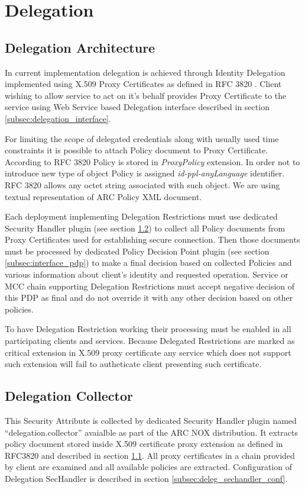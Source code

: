 \documentclass{article}                            %
\begin{document}



\section{Delegation} %
\label{sec:delegation}

\subsection{Delegation Architecture} %
\label{subsec:delegation_arch}
In current implementation delegation is achieved through Identity Delegation implemented using X.509 Proxy Certificates as defined in RFC 3820 \cite{x509proxy}. Client wishing to allow service to act on it's behalf provides Proxy Certificate to the service using Web Service based Delegation interface described in section \ref{subsec:delegation_interface}.

For limiting the scope of delegated credentials along with usually used time constraints it is possible to attach Policy document to Proxy Certificate. According to RFC 3820 Policy is stored in \textit{ProxyPolicy} extension. In order not to introduce new type of object Policy is assigned \textit{id-ppl-anyLanguage} identifier. RFC 3820 allows any octet string associated with such object. We are using textual representation of ARC Policy XML document.

Each deployment implementing Delegation Restrictions must use dedicated Security Handler plugin (see section \ref{subsec:delegation_collector}) to collect all Policy documents from Proxy Certificates used for establishing secure connection. Then those documents must be processed by dedicated Policy Decision Point plugin (see section \ref{subsec:interface_pdp}) to make a final decision based on collected Policies and various information about client's identity and requested operation. Service or MCC chain supporting Delegation Restrictions must accept negative decision of this PDP as final and do not override it with any other decision based on other policies.

To have Delegation Restriction working their processing must be enabled in all participating clients and services. Because Delegated Restrictions are marked as critical extension in X.509 proxy certificate any  service which does not support such extension will fail to autheticate client presenting such certificate.

\subsection{Delegation Collector} %
\label{subsec:delegation_collector}
This Security Attribute is collected by dedicated Security Handler plugin named ``delegation.collector'' avaialble as part of the ARC NOX distribution. It extracts policy document stored inside X.509 certificate proxy extension as defined in RFC3820 and described in section \ref{subsec:delegation_arch}. All proxy certificates in a chain provided by client are examined and all available policies are extracted. Configuration of Delegation SecHandler is described in section \ref{subsec:deleg_sechandler_conf}.
\end{document}
